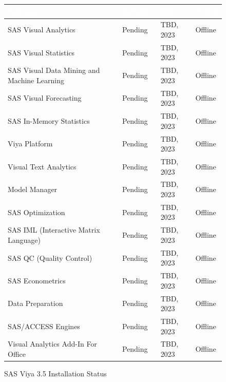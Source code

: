 \begin{figure}[H]
    \begin{center}
        \renewcommand{\arraystretch}{1.5}
        \begin{tabular}{|>{\raggedright\arraybackslash}m{9cm}
                        |>{\raggedright\arraybackslash}l
                        |>{\raggedright\arraybackslash}l
                        |>{\raggedright\arraybackslash}l
                        |}
        \hline
        \rowcolor[HTML]{196fb4}\centering\textcolor{white}{\large Software} 
                                & \centering\textcolor{white}{\large Installed}
                                & \centering\textcolor{white}{\large Date}
                                & \centering\textcolor{white}{\large Status}
                                \tabularnewline 
        \hline
        SAS Visual Analytics & Pending & TBD, 2023 & Offline \\\hline
        SAS Visual Statistics & Pending & TBD, 2023 & Offline \\\hline
        SAS Visual Data Mining and Machine Learning & Pending & TBD, 2023 & Offline \\\hline
        SAS Visual Forecasting & Pending & TBD, 2023 & Offline \\\hline
        SAS In-Memory Statistics & Pending & TBD, 2023 & Offline \\\hline
        Viya Platform & Pending & TBD, 2023 & Offline \\\hline
        Visual Text Analytics & Pending & TBD, 2023 & Offline \\\hline
        Model Manager & Pending & TBD, 2023 & Offline \\\hline
        SAS Optimization & Pending & TBD, 2023 & Offline \\\hline
        SAS IML (Interactive Matrix Language) & Pending & TBD, 2023 & Offline \\\hline
        SAS QC (Quality Control) & Pending & TBD, 2023 & Offline \\\hline
        SAS Econometrics & Pending & TBD, 2023 & Offline \\\hline 
        Data Preparation & Pending & TBD, 2023 & Offline \\\hline
        SAS/ACCESS Engines & Pending & TBD, 2023 & Offline \\\hline
        Visual Analytics Add-In For Office & Pending & TBD, 2023 & Offline \\\hline
        \end{tabular}
    \end{center}
\caption{SAS Viya 3.5 Installation Status}
\label{SAS Viya 3.5 Installation Status}
\end{figure}

